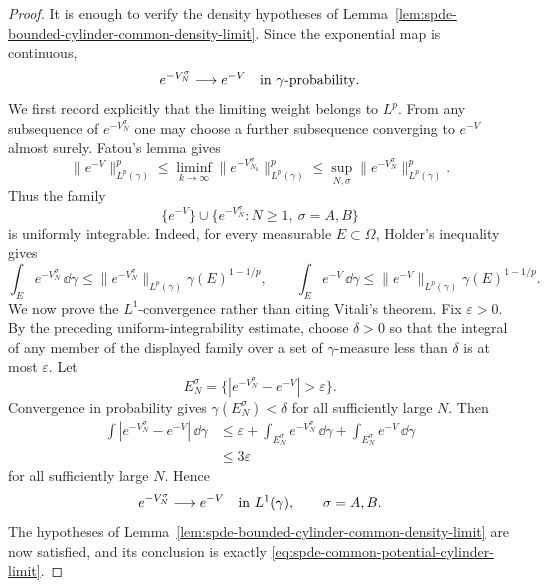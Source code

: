 \begin{proof}
It is enough to verify the density hypotheses of
Lemma~\ref{lem:spde-bounded-cylinder-common-density-limit}.  Since
the exponential map is continuous,
\[
  e^{-V_N^\sigma}\longrightarrow e^{-V}
  \quad\hbox{in }\gamma\hbox{-probability}.
\]
We first record explicitly that the limiting weight belongs to \(L^p\).
From any subsequence of \(e^{-V_N^\sigma}\) one may choose a further
subsequence converging to \(e^{-V}\) almost surely.  Fatou's lemma gives
\[
  \|e^{-V}\|_{L^p(\gamma)}^p
  \leq
  \liminf_{k\to\infty}
  \|e^{-V_{N_k}^\sigma}\|_{L^p(\gamma)}^p
  \leq
  \sup_{N,\sigma}\|e^{-V_N^\sigma}\|_{L^p(\gamma)}^p .
\]
Thus the family
\[
  \{e^{-V}\}\cup
  \{e^{-V_N^\sigma}:N\geq1,\ \sigma=A,B\}
\]
is uniformly integrable.  Indeed, for every measurable \(E\subset\Omega\),
Holder's inequality gives
\[
  \int_E e^{-V_N^\sigma}\,\dd\gamma
  \leq
  \|e^{-V_N^\sigma}\|_{L^p(\gamma)}
  \gamma(E)^{1-1/p},
  \qquad
  \int_E e^{-V}\,\dd\gamma
  \leq
  \|e^{-V}\|_{L^p(\gamma)}
  \gamma(E)^{1-1/p}.
\]
We now prove the \(L^1\)-convergence rather than citing Vitali's theorem.
Fix \(\varepsilon>0\).  By the preceding uniform-integrability estimate,
choose \(\delta>0\) so that the integral of any member of the displayed
family over a set of \(\gamma\)-measure less than \(\delta\) is at most
\(\varepsilon\).  Let
\[
  E_N^\sigma=\{|e^{-V_N^\sigma}-e^{-V}|>\varepsilon\}.
\]
Convergence in probability gives \(\gamma(E_N^\sigma)<\delta\) for all
sufficiently large \(N\).  Then
\[
\begin{aligned}
  \int |e^{-V_N^\sigma}-e^{-V}|\,\dd\gamma
  &\leq
  \varepsilon
  +\int_{E_N^\sigma} e^{-V_N^\sigma}\,\dd\gamma
  +\int_{E_N^\sigma} e^{-V}\,\dd\gamma  \\
  &\leq 3\varepsilon
\end{aligned}
\]
for all sufficiently large \(N\).  Hence
\[
  e^{-V_N^\sigma}\longrightarrow e^{-V}
  \quad\hbox{in }L^1(\gamma),
  \qquad \sigma=A,B .
\]
The hypotheses of
Lemma~\ref{lem:spde-bounded-cylinder-common-density-limit} are now
satisfied, and its conclusion is exactly
\eqref{eq:spde-common-potential-cylinder-limit}.
\end{proof}


